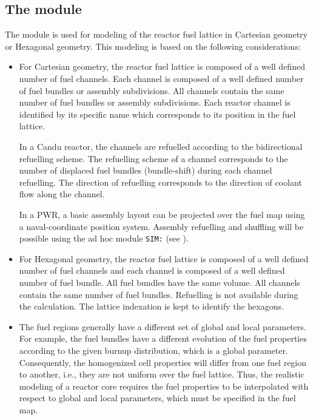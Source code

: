 \subsection{The  module}\label{sect:resini}

\vskip 0.2cm
The  module is used for modeling of the reactor fuel
lattice in  Cartesian geometry or  Hexagonal geometry. 
This modeling is based on the following considerations:

\begin{itemize}

\item For  Cartesian geometry, the reactor fuel lattice is composed of 
a well defined number of fuel channels. Each channel is composed of a well defined 
number of fuel bundles or assembly subdivisions. All channels contain
the same number of fuel bundles or assembly subdivisions. Each reactor channel is
identified by its specific name which corresponds to its position in the fuel lattice.

\vskip 0.08cm

In a Candu reactor, the channels are refuelled according
to the bidirectional refuelling scheme. The refuelling scheme of a channel
corresponds to the number of displaced fuel bundles (bundle-shift) during
each channel refuelling. The direction of refuelling corresponds to the
direction of coolant flow along the channel. 

\vskip 0.08cm

In a PWR, a basic assembly layout can be projected over the fuel map using a
naval-coordinate position system. Assembly refuelling and shuffling will be possible using
the ad hoc module {\tt SIM:} (see ).

\item For  Hexagonal geometry, the reactor fuel lattice is composed of
a well defined number of fuel channels and each channel is composed of a well defined
number of fuel bundle. All fuel bundles have the same volume. All channels contain
the same number of fuel bundles. Refuelling is not available during the calculation. The
lattice indexation is kept to identify the hexagons.

\item The fuel regions generally have a different set of global and local
parameters. For example, the fuel bundles have a different evolution of the
fuel properties according to the given burnup distribution, which is a global
parameter. Consequently, the homogenized cell properties will differ from one
fuel region to another, i.e., they are not uniform over the fuel lattice. Thus,
the realistic modeling of a reactor core requires the fuel properties to be
interpolated with respect to global and local parameters, which must be
specified in the fuel map.

\end{itemize}

